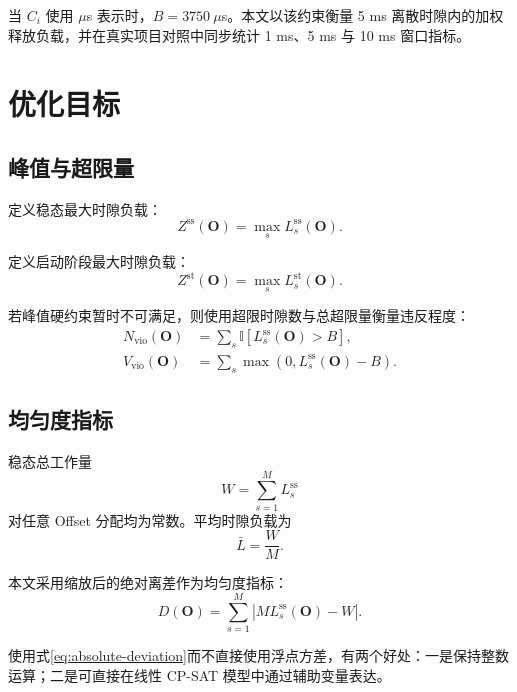 \documentclass[UTF8,12pt,a4paper]{ctexart}
\newcommand{\ind}{\mathbb{I}}
\begin{document}
当 $C_i$ 使用 $\mu$s 表示时，$B=3750\ \mu$s。本文以该约束衡量 5 ms 离散时隙内的加权释放负载，并在真实项目对照中同步统计 1 ms、5 ms 与 10 ms 窗口指标。

\section{优化目标}

\subsection{峰值与超限量}

定义稳态最大时隙负载：
\begin{equation}
 Z^{\mathrm{ss}}(\symbf{O})=\max_s L^{\mathrm{ss}}_s(\symbf{O}).
\label{eq:zss}
\end{equation}

定义启动阶段最大时隙负载：
\begin{equation}
 Z^{\mathrm{st}}(\symbf{O})=\max_s L^{\mathrm{st}}_s(\symbf{O}).
\label{eq:zst}
\end{equation}

若峰值硬约束暂时不可满足，则使用超限时隙数与总超限量衡量违反程度：
\begin{align}
 N_{\mathrm{vio}}(\symbf{O})
 &=\sum_s \ind\!\left[L^{\mathrm{ss}}_s(\symbf{O})>B\right],\\
 V_{\mathrm{vio}}(\symbf{O})
 &=\sum_s \max\left(0,L^{\mathrm{ss}}_s(\symbf{O})-B\right).
\label{eq:violations}
\end{align}

\subsection{均匀度指标}

稳态总工作量
\begin{equation}
 W=\sum_{s=1}^{M}L^{\mathrm{ss}}_s
\end{equation}
对任意 Offset 分配均为常数。平均时隙负载为
\begin{equation}
 \bar L=\frac{W}{M}.
\end{equation}

本文采用缩放后的绝对离差作为均匀度指标：
\begin{equation}
 D(\symbf{O})=
 \sum_{s=1}^{M}\left|M L^{\mathrm{ss}}_s(\symbf{O})-W\right|.
\label{eq:absolute-deviation}
\end{equation}

使用式\eqref{eq:absolute-deviation}而不直接使用浮点方差，有两个好处：一是保持整数运算；二是可直接在线性 CP-SAT 模型中通过辅助变量表达。
\end{document}
